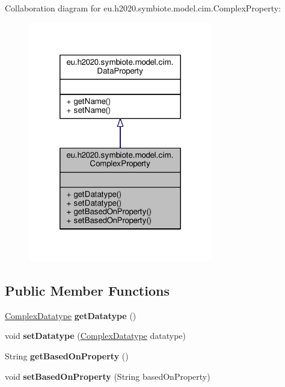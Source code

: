 Collaboration diagram for eu.\+h2020.\+symbiote.\+model.\+cim.\+Complex\+Property\+:
\nopagebreak
\begin{figure}[H]
\begin{center}
\leavevmode
\includegraphics[width=228pt]{classeu_1_1h2020_1_1symbiote_1_1model_1_1cim_1_1ComplexProperty__coll__graph}
\end{center}
\end{figure}
\subsection*{Public Member Functions}
\begin{DoxyCompactItemize}
\item 
\mbox{\label{classeu_1_1h2020_1_1symbiote_1_1model_1_1cim_1_1ComplexProperty_a4809b1a0b0ac91673e0e84080cc0b40f}} 
\hyperlink{classeu_1_1h2020_1_1symbiote_1_1model_1_1cim_1_1ComplexDatatype}{Complex\+Datatype} {\bfseries get\+Datatype} ()
\item 
\mbox{\label{classeu_1_1h2020_1_1symbiote_1_1model_1_1cim_1_1ComplexProperty_aef0ccf992d5280f12c183f16c7dc9f23}} 
void {\bfseries set\+Datatype} (\hyperlink{classeu_1_1h2020_1_1symbiote_1_1model_1_1cim_1_1ComplexDatatype}{Complex\+Datatype} datatype)
\item 
\mbox{\label{classeu_1_1h2020_1_1symbiote_1_1model_1_1cim_1_1ComplexProperty_a98241ccbdee6c4fe35631c186e6cf5b6}} 
String {\bfseries get\+Based\+On\+Property} ()
\item 
\mbox{\label{classeu_1_1h2020_1_1symbiote_1_1model_1_1cim_1_1ComplexProperty_af948215819c802f7c356757c25339e37}} 
void {\bfseries set\+Based\+On\+Property} (String based\+On\+Property)
\end{DoxyCompactItemize}


